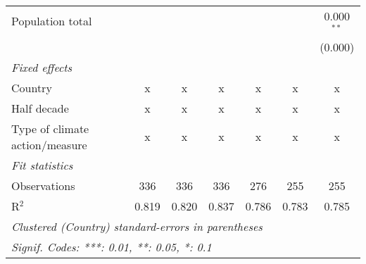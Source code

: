 \begin{tabular}{lcccccc}
   Population total                                                     &         &         &                &                &                & 0.000$^{**}$\\   
                                                                        &         &         &                &                &                & (0.000)\\   
   \emph{Fixed effects}\\
   Country                                                              & x       & x       & x              & x              & x              & x\\  
   Half decade                                                          & x       & x       & x              & x              & x              & x\\  
   Type of climate action/measure                                       & x       & x       & x              & x              & x              & x\\  
   \midrule \emph{Fit statistics}\\
   Observations                                                         & 336     & 336     & 336            & 276            & 255            & 255\\  
   R$^2$                                                                & 0.819   & 0.820   & 0.837          & 0.786          & 0.783          & 0.785\\  
   \midrule
   \multicolumn{7}{l}{\emph{Clustered (Country) standard-errors in parentheses}}\\
   \multicolumn{7}{l}{\emph{Signif. Codes: ***: 0.01, **: 0.05, *: 0.1}}\\
\end{tabular}
\par\endgroup


